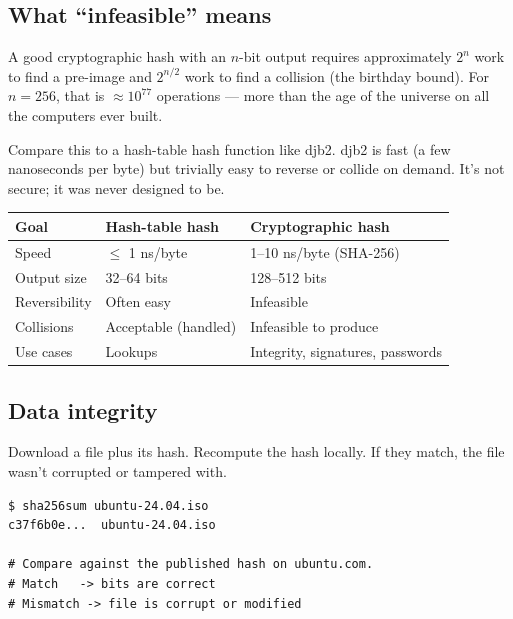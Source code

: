 \documentclass[11pt]{article}
\begin{document}
\subsection*{What ``infeasible'' means}

A good cryptographic hash with an $n$-bit output requires
approximately $2^n$ work to find a pre-image and $2^{n/2}$ work
to find a collision (the birthday bound). For $n = 256$, that is
$\approx 10^{77}$ operations --- more than the age of the
universe on all the computers ever built.

Compare this to a hash-table hash function like djb2. djb2 is
fast (a few nanoseconds per byte) but trivially easy to reverse
or collide on demand. It's not secure; it was never designed to
be.

\begin{center}
\begin{tabular}{|l|l|l|}
\hline
\textbf{Goal} & \textbf{Hash-table hash} & \textbf{Cryptographic hash} \\
\hline
Speed          & $\leq$ 1 ns/byte    & 1--10 ns/byte (SHA-256) \\
Output size    & 32--64 bits         & 128--512 bits \\
Reversibility  & Often easy           & Infeasible \\
Collisions     & Acceptable (handled) & Infeasible to produce \\
Use cases      & Lookups              & Integrity, signatures, passwords \\
\hline
\end{tabular}
\end{center}

\subsection*{Data integrity}

Download a file plus its hash. Recompute the hash locally. If
they match, the file wasn't corrupted or tampered with.

\begin{examplebox}
\begin{lstlisting}[basicstyle=\ttfamily\small,frame=single]
$ sha256sum ubuntu-24.04.iso
c37f6b0e...  ubuntu-24.04.iso

# Compare against the published hash on ubuntu.com.
# Match   -> bits are correct
# Mismatch -> file is corrupt or modified
\end{lstlisting}
\end{examplebox}
\end{document}
